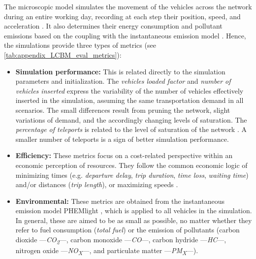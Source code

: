 The microscopic model simulates the movement of the vehicles across the network during an entire working day, recording at each step their position, speed, and acceleration \citep{Helbing2010}. It also determines their energy consumption and pollutant emissions based on the coupling with the instantaneous emission model \citep{Hausberger2014}. Hence, the simulations provide three types of metrics (see \cref{tab:appendix_LCBM_eval_metrics}):
\begin{itemize}
    \item \textbf{Simulation performance:} This is related directly to the simulation parameters and initialization. The \emph{vehicles loaded factor} and \emph{number of vehicles inserted} express the variability of the number of vehicles effectively inserted in the simulation, assuming the same transportation demand in all scenarios. The small differences result from pruning the network, slight variations of demand, and the accordingly changing levels of saturation. The \emph{percentage of teleports} is related to the level of saturation of the network \citep{GermanAerospaceCenterDLRandothers2021teleporting}. A smaller number of teleports is a sign of better simulation performance.
    \item \textbf{Efficiency:} These metrics focus on a cost-related perspective within an economic perception of resources. They follow the common economic logic of minimizing times (e.g. \emph{departure delay}, \emph{trip duration}, \emph{time loss}, \emph{waiting time}) and/or distances (\emph{trip length}), or maximizing speeds \citep{GermanAerospaceCenterDLRandothers}.
    \item \textbf{Environmental:} These metrics are obtained from the instantaneous emission model PHEMlight \citep{Hausberger2014}, which is applied to all vehicles in the simulation. In general, these are aimed to be as small as possible, no matter whether they refer to fuel consumption (\emph{total fuel}) or the emission of pollutants (carbon dioxide —\emph{CO\textsubscript{2}}—, carbon monoxide —\emph{CO}—, carbon hydride —\emph{HC}—, nitrogen oxide —\emph{NO\textsubscript{X}}—, and particulate matter —\emph{PM\textsubscript{X}}—).  
\end{itemize}

